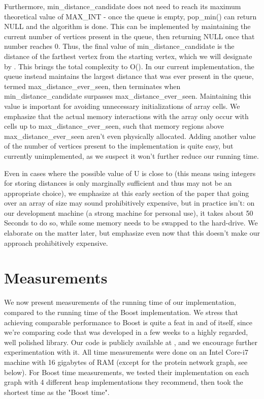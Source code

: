 \documentclass[conference,10pt,twocolumn]{IEEEtran}
\begin{document}
Furthermore, min\_distance\_candidate does not need to reach its maximum theoretical value of MAX\_INT - once the queue is empty, pop\_min() can return NULL and the algorithm is done. This can be implemented by maintaining the current number of vertices present in the queue, then returning NULL once that number reaches 0. Thus, the final value of min\_distance\_candidate is the distance of the farthest vertex from the starting vertex, which we will designate by . This brings the total complexity to O().
In our current implementation, the queue instead maintains the largest distance that was ever present in the queue, termed max\_distance\_ever\_seen, then terminates when min\_distance\_candidate surpasses max\_distance\_ever\_seen. Maintaining this value is important for avoiding unnecessary initializations of array cells. We emphasize that the actual memory interactions with the array only occur with cells up to max\_distance\_ever\_seen, such that memory regions above max\_distance\_ever\_seen aren't even physically allocated.
Adding another value of the number of vertices present to the implementation is quite easy, but currently unimplemented, as we suspect it won't further reduce our running time. 

Even in cases where the possible value of U is close to  (this means using integers for storing distances is only marginally sufficient and thus may not be an appropriate choice), we emphasize at this early section of the paper that going over an array of size  may sound prohibitively expensive, but in practice isn't: on our development machine (a strong machine for personal use), it takes about 50 Seconds to do so, while some memory needs to be swapped to the hard-drive. We elaborate on the matter later, but emphasize even now that this doesn't make our approach prohibitively expensive.

\section{Measurements} \label{sec:meas}


We now present measurements of the running time of our implementation, compared to the running time of the Boost implementation. We stress that achieving comparable performance to Boost is quite a feat in and of itself, since we're comparing code that was developed in a few weeks to a highly regarded, well polished library. Our code is publicly available at \cite{github}, and we encourage further experimentation with it. All time measurements were done on an Intel Core-i7 machine with 16 gigabytes of RAM (except for the protein network graph, see below). For Boost time measurements, we tested their implementation on each graph with 4 different heap implementations they recommend, then took the shortest time as the "Boost time". 
\end{document}
